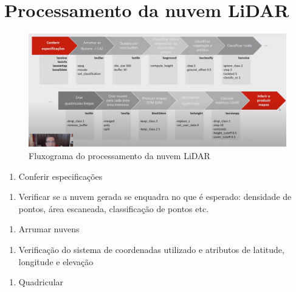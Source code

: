 \documentclass[
]{article}
\providecommand{\tightlist}{%
  \setlength{\itemsep}{0pt}\setlength{\parskip}{0pt}}
\begin{document}
\section{Processamento da nuvem
LiDAR}\label{processamento-da-nuvem-lidar}

\begin{figure}

{\centering \includegraphics[width=0.8\linewidth]{IMAGES/fluxograma-funcoes} 

}

\caption{Fluxograma do processamento da nuvem LiDAR}\label{fig:unnamed-chunk-7}
\end{figure}

\begin{enumerate}
\def\labelenumi{\arabic{enumi}.}
\tightlist
\item
  Conferir especificações
\end{enumerate}

\begin{enumerate}
\def\labelenumi{\roman{enumi}.}
\tightlist
\item
  Verificar se a nuvem gerada se enquadra no que é esperado: densidade
  de pontos, área escaneada, classificação de pontos etc.
\end{enumerate}

\begin{enumerate}
\def\labelenumi{\arabic{enumi}.}
\setcounter{enumi}{1}
\tightlist
\item
  Arrumar nuvens
\end{enumerate}

\begin{enumerate}
\def\labelenumi{\roman{enumi}.}
\tightlist
\item
  Verificação do sistema de coordenadas utilizado e atributos de
  latitude, longitude e elevação
\end{enumerate}

\begin{enumerate}
\def\labelenumi{\arabic{enumi}.}
\setcounter{enumi}{2}
\tightlist
\item
  Quadricular
\end{enumerate}
\end{document}
